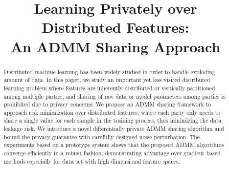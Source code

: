 \documentclass[letterpaper]{article} %
\title{Learning Privately over Distributed Features:\\An ADMM Sharing Approach}
\begin{document}
\maketitle

\begin{abstract}
Distributed machine learning has been widely studied in order to handle exploding amount of data.
In this paper, we study an important yet less visited distributed learning problem where features are inherently distributed or vertically partitioned among multiple parties, and sharing of raw data or model parameters among parties is prohibited due to privacy concerns.
We propose an ADMM sharing framework to approach risk minimization over distributed features, where each party only needs to share a single value for each sample in the training process, thus minimizing the data leakage risk.
We introduce a novel differentially private ADMM sharing algorithm and bound the privacy guarantee with carefully designed noise perturbation. The experiments based on a prototype system shows that the proposed ADMM algorithms converge efficiently in a robust fashion, demonstrating advantage over gradient based methods especially for data set with high dimensional feature spaces.
\end{abstract}











\newpage
\clearpage
\onecolumn

\end{document}
